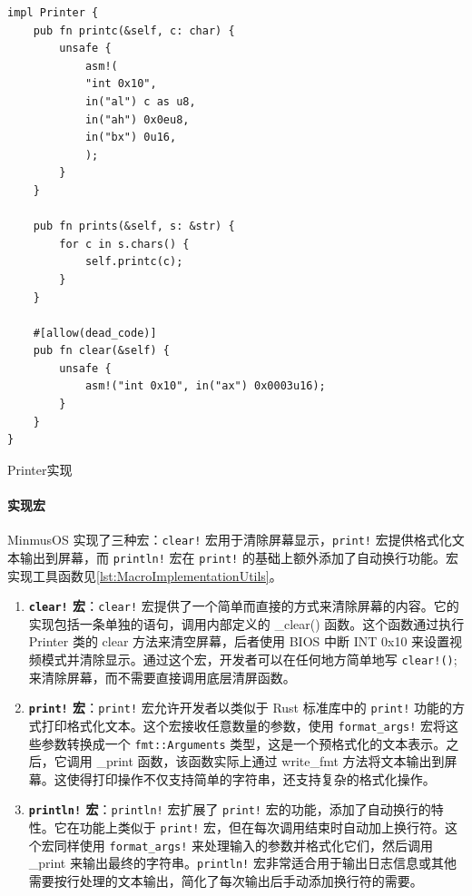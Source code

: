 \begin{listing}[htbp]
    \begin{verbatim}
impl Printer {
    pub fn printc(&self, c: char) {
        unsafe {
            asm!(
            "int 0x10",
            in("al") c as u8,
            in("ah") 0x0eu8,
            in("bx") 0u16,
            );
        }
    }

    pub fn prints(&self, s: &str) {
        for c in s.chars() {
            self.printc(c);
        }
    }

    #[allow(dead_code)]
    pub fn clear(&self) {
        unsafe {
            asm!("int 0x10", in("ax") 0x0003u16);
        }
    }
}
    \end{verbatim}
    \caption{Printer实现}\label{lst:PrinterImplementation}
\end{listing}

\paragraph{实现宏}

MinmusOS 实现了三种宏：\texttt{clear!} 宏用于清除屏幕显示，\texttt{print!} 宏提供格式化文本输出到屏幕，而 \texttt{println!} 宏在 \texttt{print!} 的基础上额外添加了自动换行功能。宏实现工具函数见\cref{lst:MacroImplementationUtils}。

\begin{enumerate}
    \item \textbf{\texttt{clear!} 宏}：\texttt{clear!} 宏提供了一个简单而直接的方式来清除屏幕的内容。它的实现包括一条单独的语句，调用内部定义的 \_clear() 函数。这个函数通过执行 Printer 类的 clear 方法来清空屏幕，后者使用 BIOS 中断 INT 0x10 来设置视频模式并清除显示。通过这个宏，开发者可以在任何地方简单地写 \texttt{clear!()}; 来清除屏幕，而不需要直接调用底层清屏函数。
    \item \textbf{\texttt{print!} 宏}：\texttt{print!} 宏允许开发者以类似于 Rust 标准库中的 \texttt{print!} 功能的方式打印格式化文本。这个宏接收任意数量的参数，使用 \texttt{format\_args!} 宏将这些参数转换成一个 \texttt{fmt::Arguments} 类型，这是一个预格式化的文本表示。之后，它调用 \_print 函数，该函数实际上通过 write\_fmt 方法将文本输出到屏幕。这使得打印操作不仅支持简单的字符串，还支持复杂的格式化操作。
    \item \textbf{\texttt{println!} 宏}：\texttt{println!} 宏扩展了 \texttt{print!} 宏的功能，添加了自动换行的特性。它在功能上类似于 \texttt{print!} 宏，但在每次调用结束时自动加上换行符。这个宏同样使用 \texttt{format\_args!} 来处理输入的参数并格式化它们，然后调用 \_print 来输出最终的字符串。\texttt{println!} 宏非常适合用于输出日志信息或其他需要按行处理的文本输出，简化了每次输出后手动添加换行符的需要。
\end{enumerate}

